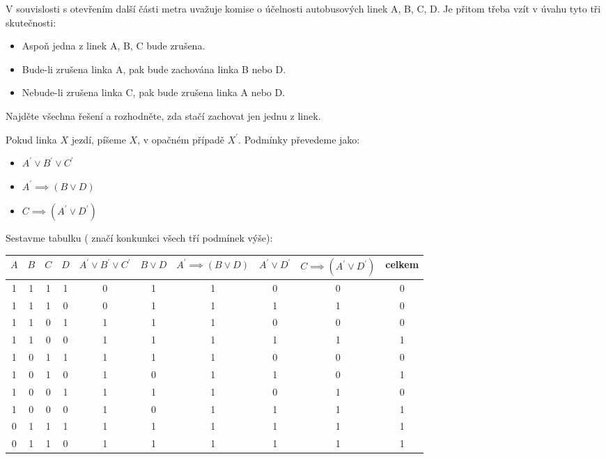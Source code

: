 \begin{example}[SMP 143/13]
  V souvislosti s otevřením další části metra uvažuje komise o účelnosti autobusových linek A, B, C, D. Je přitom třeba vzít v úvahu tyto tři skutečnosti:
  \begin{itemize}
    \item  Aspoň jedna z linek A, B, C bude zrušena.
    \item Bude-li zrušena linka A, pak bude zachována linka B nebo D.
    \item Nebude-li zrušena linka C, pak bude zrušena linka A nebo D.
  \end{itemize}
  Najděte všechna řešení a rozhodněte, zda stačí zachovat jen jednu z linek.

  \rm Pokud linka $X$ jezdí, píšeme $X$, v opačném případě $X^\prime.$ Podmínky převedeme jako:
  \begin{itemize}
    \item $A^\prime\lor B^\prime \lor C^\prime$
    \item $A^\prime \implies (B\lor D)$
    \item $C\implies (A^\prime\lor D^\prime)$
  \end{itemize}
  Sestavme tabulku ( značí konkunkci všech tří podmínek výše):
  \begin{widetext}
    \begin{center}
      \begin{tabular}{c c c c | c c c c c | c}
        $A$ & $B$ & $C$ & $D$ & $A^\prime\lor B^\prime \lor C^\prime$ & $B\lor D$ & $A^\prime \implies (B\lor D)$ & $A^\prime \lor D^\prime$ & $C\implies (A^\prime\lor D^\prime)$ & celkem \\
        \hline
        1 & 1 & 1 & 1 & 0 & 1 & 1 & 0 & 0 & 0 \\
        1 & 1 & 1 & 0 & 0 & 1 & 1 & 1 & 1 & 0 \\
        1 & 1 & 0 & 1 & 1 & 1 & 1 & 0 & 0 & 0 \\
        1 & 1 & 0 & 0 & 1 & 1 & 1 & 1 & 1 & 1 \\
        1 & 0 & 1 & 1 & 1 & 1 & 1 & 0 & 0 & 0 \\
        1 & 0 & 1 & 0 & 1 & 0 & 1 & 1 & 0 & 1 \\
        1 & 0 & 0 & 1 & 1 & 1 & 1 & 0 & 1 & 0 \\
        1 & 0 & 0 & 0 & 1 & 0 & 1 & 1 & 1 & 1 \\
        0 & 1 & 1 & 1 & 1 & 1 & 1 & 1 & 1 & 1 \\
        0 & 1 & 1 & 0 & 1 & 1 & 1 & 1 & 1 & 1 \\

\end{tabular}
\end{center}
\end{widetext}
\end{example}
